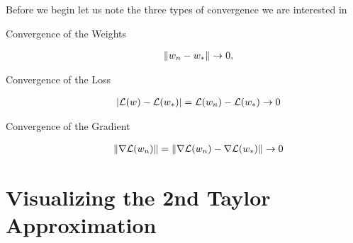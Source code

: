 Before we begin let us note the three types of convergence we are interested in
\begin{description}
	\item[Convergence of the Weights]
	\begin{align*}
		\|w_n - w_*\| \to 0,
	\end{align*}
	\item[Convergence of the Loss]
	\begin{align*}
		|\mathcal{L}(w) - \mathcal{L}(w_*)|
		=\mathcal{L}(w_n) - \mathcal{L}(w_*) \to 0
	\end{align*}
	\item[Convergence of the Gradient]
	\begin{align*}
		\|\nabla\mathcal{L}(w_n)\|
		= \|\nabla\mathcal{L}(w_n) - \nabla\mathcal{L}(w_*)\| \to 0
	\end{align*}
\end{description}

\section{Visualizing the 2nd Taylor Approximation}\label{sec: visualize gd}

